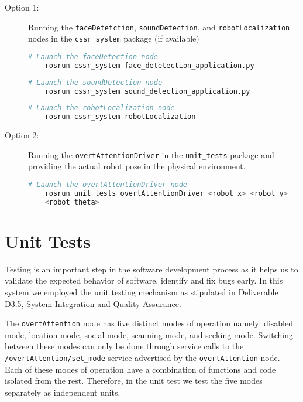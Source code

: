 \documentclass{CSSRforAfrica}
\begin{document}
\begin{description}
\item[Option 1:] Running the \texttt{faceDetetction}, \texttt{soundDetection}, and \texttt{robotLocalization} nodes in the \texttt{cssr\_system} package (if available)
\begin{lstlisting}[style=withoutNumbering, language=bash]
	# Launch the faceDetection node
	rosrun cssr_system face_detetection_application.py
\end{lstlisting}

\begin{lstlisting}[style=withoutNumbering, language=bash]
	# Launch the soundDetection node
	rosrun cssr_system sound_detection_application.py
\end{lstlisting}

\begin{lstlisting}[style=withoutNumbering, language=bash]
	# Launch the robotLocalization node
	rosrun cssr_system robotLocalization
\end{lstlisting}

\item[Option 2:] Running the \texttt{overtAttentionDriver} in the \texttt{unit\_tests} package and providing the actual robot pose in the physical environment.
\begin{lstlisting}[style=withoutNumbering, language=bash]
	# Launch the overtAttentionDriver node
	rosrun unit_tests overtAttentionDriver <robot_x> <robot_y> 
	<robot_theta>
\end{lstlisting}


\end{description}

\pagebreak
\section{Unit Tests}
Testing is an important step in the software development process as it helps us to validate the expected behavior of software, identify and fix bugs early. In this system we employed the unit testing mechanism as stipulated in Deliverable D3.5, System Integration and Quality Assurance.

The \texttt{overtAttention} node has five distinct modes of operation namely: disabled mode, location mode, social mode, scanning mode, and seeking mode. Switching between these modes can only be done through service calls to the \texttt{/overtAttention/set\_mode} service advertised by the \texttt{overtAttention} node. Each of these modes of operation have a combination of functions and code isolated from the rest. Therefore, in the unit test we test the five modes separately as independent units.
\end{document}
